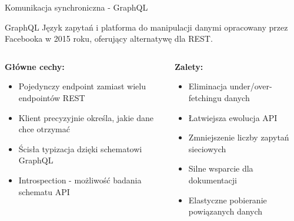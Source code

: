\documentclass[aspectratio=169]{beamer}
\begin{document}
\begin{frame}{Komunikacja synchroniczna - GraphQL}
    \begin{block}{GraphQL}
        Język zapytań i platforma do manipulacji danymi opracowany przez Facebooka w 2015 roku, oferujący alternatywę dla REST.
    \end{block}
    
    \begin{columns}
        \begin{column}{0.5\textwidth}
            \textbf{Główne cechy:}
            \begin{itemize}
                \item Pojedynczy endpoint zamiast wielu endpointów REST
                \item Klient precyzyjnie określa, jakie dane chce otrzymać
                \item Ścisła typizacja dzięki schematowi GraphQL
                \item Introspection - możliwość badania schematu API
            \end{itemize}
        \end{column}
        
        \begin{column}{0.5\textwidth}
            \textbf{Zalety:}
            \begin{itemize}
                \item Eliminacja under/over-fetchingu danych
                \item Łatwiejsza ewolucja API
                \item Zmniejszenie liczby zapytań sieciowych
                \item Silne wsparcie dla dokumentacji
                \item Elastyczne pobieranie powiązanych danych
            \end{itemize}
        \end{column}
    \end{columns}
\end{frame}
\end{document}
